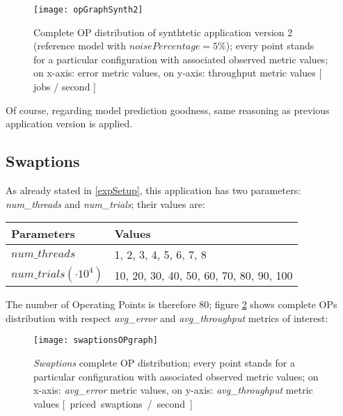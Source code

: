 \begin{figure}[H]

    \centering
    \texttt{[image: opGraphSynth2]}
    \caption{Complete OP distribution of synthtetic application version 2 (reference model with $noisePercentage = 5\%$); every point stands for a particular configuration with associated observed metric values; on x-axis: error metric values, on y-axis: throughput metric values [ jobs / second ]}
    \label{fig::opListSynth2}
    
\end{figure}

Of course, regarding model prediction goodness, same reasoning as previous application version is applied.


\subsection{Swaptions}

As already stated in \ref{expSetup}, this application has two parameters: \textit{num\_\-threads} and \textit{num\_\-trials}; their values are:

\begin{center}

    \begin{tabular}{ll}
    
        \toprule
        Parameters & Values \\
        \midrule
        $num\_threads$ & 1, 2, 3, 4, 5, 6, 7, 8 \\
        $num\_trials (\cdot 10^4)$ & 10, 20, 30, 40, 50, 60, 70, 80, 90, 100 \\
        \bottomrule 
    
    \end{tabular}

\end{center}

The number of Operating Points is therefore 80; figure \ref{fig::swaptionsOPs} shows complete OPs distribution with respect \textit{avg\_error} and \textit{avg\_throughput} metrics of interest:

\begin{figure}[H]

    \centering
    \texttt{[image: swaptionsOPgraph]}
    \caption{\textit{Swaptions} complete OP distribution; every point stands for a particular configuration with associated observed metric values; on x-axis: \textit{avg\_error} metric values, on y-axis: \textit{avg\_throughput} metric values \hbox{[ priced swaptions / second ]}}
    \label{fig::swaptionsOPs}
    
\end{figure}





